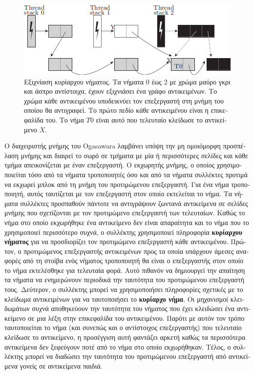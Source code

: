 \begin{greek}
\begin{figure}[H]
  \centering
  \includegraphics{figures/par_3}
  \caption[Εξιχνίαση κυρίαρχου νήματος.]
    {Εξιχνίαση κυρίαρχου νήματος. Τα νήματα 0 έως 2 με χρώμα
     μαύρο γκρι και άσπρο αντίστοιχα, έχουν εξιχνιάσει ένα
     γράφο αντικειμένων. Το χρώμα κάθε αντικειμένου υποδεικνύει
     τον επεξεργαστή στη μνήμη του οποίου θα αντιγραφεί. Το
     πρώτο πεδίο κάθε αντικειμένου είναι η επικεφαλίδα του.
     Το νήμα $T0$ είναι αυτό που τελευταίο κλείδωσε το αντικείμενο
     $X$.}
  \label{fig:par_3}
\end{figure}

 Ο διαχειριστής μνήμης του Ogasawara \cite{DBLP:conf/oopsla/Ogasawara09}
 λαμβάνει υπόψη την μη ομοιόμορφη προσπέλαση μνήμης και
 διαιρεί το σωρό σε τμήματα με μία ή περισσότερες σελίδες
 και κάθε τμήμα απεικονίζεται με έναν επεξεργαστή. Ο εκχωρητής
 μνήμης, ο οποίος χρησιμοποιείται τόσο από τα νήματα τροποποιητές
 όσο και από τα νήματα συλλέκτες προτιμά να εκχωρεί μπλοκ από
 τη μνήμη του προτιμώμενου επεξεργαστή. Για ένα νήμα τροποποιητή,
 αυτός ταυτίζεται με τον επεξεργαστή στον οποίο εκτελείται το
 νήμα. Τα νήματα συλλέκτες προσπαθούν πάντοτε να αντιγράψουν
 ζωντανά αντικείμενα σε σελίδες μνήμης που σχετίζονται με τον
 προτιμώμενο επεξεργαστή των τελευταίων. Καθώς το νήμα στο
 οποίο εκχωρήθηκε ένα αντικείμενο δεν είναι απαραίτητα και το
 νήμα που το χρησιμοποιεί περισσότερο συχνά, ο συλλέκτης
 χρησιμοποιεί πληροφορία \textbf{κυρίαρχου νήματος} για να
 προσδιορίζει τον προτιμώμενο επεξεργαστή κάθε αντικειμένου.
 Πρώτον, ο προτιμώμενος επεξεργαστής αντικειμένων προς τα οποία
 υπάρχουν άμεσες αναφορές από τη στοίβα ενός νήματος τροποποιητή
 θα είναι ο επεξεργαστής στον οποίο το νήμα εκτελέσθηκε για
 τελευταία φορά. Αυτό πιθανόν να δημιουργεί την απαίτηση τα
 νήματα να ενημερώνουν περιοδικά την ταυτότητα του προτιμώμενου
 επεξεργαστή τους. Δεύτερον, ο συλλέκτης μπορεί να χρησιμοποιήσει
 πληροφορίες σχετικές με το κλείδωμα αντικειμένων για να ταυτοποιήσει
 το \textbf{κυρίαρχο νήμα}. Οι μηχανισμοί κλειδωμάτων συχνά
 αποθηκεύουν την ταυτότητα του νήματος που έχει κλειδώσει ένα
 αντικείμενο σε μια λέξη στην επικεφαλίδα του αντικειμένου.
 Παρότι με αυτόν τον τρόπο ταυτοποιείται το νήμα (και συνεπώς
 και ο αντίστοιχος επεξεργαστής) που τελευταίο κλείδωσε το
 αντικείμενο, η προσέγγιση αυτή φαντάζει αρκετή καθώς τα
 περισσότερα αντικείμενα δεν ξεφεύγουν ποτέ από το νήμα στο
 οποίο εκχωρήθηκαν. Τέλος, ο συλλέκτης μπορεί να διαδώσει
 την ταυτότητα του προτιμώμενου επεξεργαστή από αντικείμενα
 γονείς σε αντικείμενα παιδιά.
  

\end{greek}
